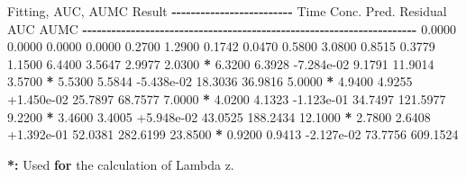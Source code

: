 \documentclass[
  10pt,
]{krantz}
\makeatletter
\newenvironment{Shaded}{\begin{snugshade}}{\end{snugshade}}
\newcommand{\ControlFlowTok}[1]{\textcolor[rgb]{0.13,0.29,0.53}{\textbf{#1}}}
\newcommand{\ErrorTok}[1]{\textcolor[rgb]{0.64,0.00,0.00}{\textbf{#1}}}
\newcommand{\FloatTok}[1]{\textcolor[rgb]{0.00,0.00,0.81}{#1}}
\newcommand{\NormalTok}[1]{#1}
\newcommand{\OperatorTok}[1]{\textcolor[rgb]{0.81,0.36,0.00}{\textbf{#1}}}
\newcommand{\StringTok}[1]{\textcolor[rgb]{0.31,0.60,0.02}{#1}}
\newenvironment{kframe}{%
\medskip{}
\setlength{\fboxsep}{.8em}
 \def\at@end@of@kframe{}%
 \ifinner\ifhmode%
  \def\at@end@of@kframe{\end{minipage}}%
  \begin{minipage}{\columnwidth}%
 \fi\fi%
 \def\FrameCommand##1{\hskip\@totalleftmargin \hskip-\fboxsep
 \colorbox{shadecolor}{##1}\hskip-\fboxsep
     \hskip-\linewidth \hskip-\@totalleftmargin \hskip\columnwidth}%
 \MakeFramed {\advance\hsize-\width
   \@totalleftmargin\z@ \linewidth\hsize
   \@setminipage}}%
 {\par\unskip\endMakeFramed%
 \at@end@of@kframe}
\renewenvironment{Shaded}{\begin{kframe}}{\end{kframe}}
\makeatother
\begin{document}
\begin{Shaded}
\begin{Highlighting}[]
\NormalTok{Fitting, AUC, AUMC Result}
\OperatorTok{{-}{-}{-}{-}{-}{-}{-}{-}{-}{-}{-}{-}{-}{-}{-}{-}{-}{-}{-}{-}{-}{-}{-}{-}{-}}
\StringTok{      }\NormalTok{Time         Conc.      Pred.   Residual       AUC       AUMC}
\OperatorTok{{-}{-}{-}{-}{-}{-}{-}{-}{-}{-}{-}{-}{-}{-}{-}{-}{-}{-}{-}{-}{-}{-}{-}{-}{-}{-}{-}{-}{-}{-}{-}{-}{-}{-}{-}{-}{-}{-}{-}{-}{-}{-}{-}{-}{-}{-}{-}{-}{-}{-}{-}{-}{-}{-}{-}{-}{-}{-}{-}{-}{-}{-}{-}{-}{-}{-}{-}{-}{-}}
\StringTok{     }\FloatTok{0.0000}       \FloatTok{0.0000}                           \FloatTok{0.0000}     \FloatTok{0.0000}
     \FloatTok{0.2700}       \FloatTok{1.2900}                           \FloatTok{0.1742}     \FloatTok{0.0470}
     \FloatTok{0.5800}       \FloatTok{3.0800}                           \FloatTok{0.8515}     \FloatTok{0.3779}
     \FloatTok{1.1500}       \FloatTok{6.4400}                           \FloatTok{3.5647}     \FloatTok{2.9977}
     \FloatTok{2.0300} \OperatorTok{*}\StringTok{     }\FloatTok{6.3200}     \FloatTok{6.3928} \FloatTok{{-}7.284e{-}02}     \FloatTok{9.1791}    \FloatTok{11.9014}
     \FloatTok{3.5700} \OperatorTok{*}\StringTok{     }\FloatTok{5.5300}     \FloatTok{5.5844} \FloatTok{{-}5.438e{-}02}    \FloatTok{18.3036}    \FloatTok{36.9816}
     \FloatTok{5.0000} \OperatorTok{*}\StringTok{     }\FloatTok{4.9400}     \FloatTok{4.9255} \FloatTok{+1.450e{-}02}    \FloatTok{25.7897}    \FloatTok{68.7577}
     \FloatTok{7.0000} \OperatorTok{*}\StringTok{     }\FloatTok{4.0200}     \FloatTok{4.1323} \FloatTok{{-}1.123e{-}01}    \FloatTok{34.7497}   \FloatTok{121.5977}
     \FloatTok{9.2200} \OperatorTok{*}\StringTok{     }\FloatTok{3.4600}     \FloatTok{3.4005} \FloatTok{+5.948e{-}02}    \FloatTok{43.0525}   \FloatTok{188.2434}
    \FloatTok{12.1000} \OperatorTok{*}\StringTok{     }\FloatTok{2.7800}     \FloatTok{2.6408} \FloatTok{+1.392e{-}01}    \FloatTok{52.0381}   \FloatTok{282.6199}
    \FloatTok{23.8500} \OperatorTok{*}\StringTok{     }\FloatTok{0.9200}     \FloatTok{0.9413} \FloatTok{{-}2.127e{-}02}    \FloatTok{73.7756}   \FloatTok{609.1524}

\OperatorTok{*}\ErrorTok{:}\StringTok{ }\NormalTok{Used }\ControlFlowTok{for}\NormalTok{ the calculation of Lambda z.}



\end{Highlighting}
\end{Shaded}
\end{document}
